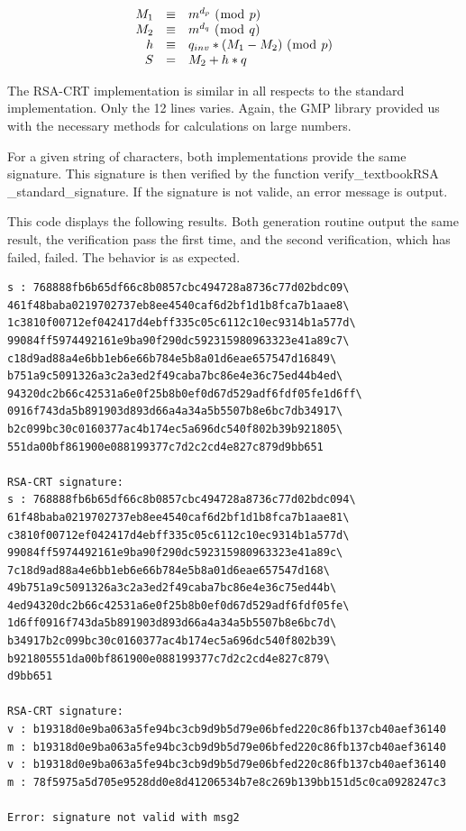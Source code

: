 \documentclass[a4paper]{report}
\begin{document}
\[
\left .
   \begin{array}{r c l}
      M_1      & \equiv & m^{d_p}\ (\bmod\ p) \\
      M_2      & \equiv & m^{d_q}\ (\bmod\ q) \\
      h           & \equiv & q_{inv} * (M_1 - M_2)\ (\bmod\ p) \\
      S          & =         & M_2 + h*q 
   \end{array}
\right .
\]

The RSA-CRT implementation is similar in all respects to the standard implementation. Only the 12 lines varies. Again, the GMP library provided us with the necessary methods for calculations on large numbers.


For a given string of characters, both implementations provide the same signature. This signature is then verified by the function verify\_textbookRSA\\\_standard\_signature. If the signature is not valide, an error message is output.


This code displays the following results. Both generation routine output the same result, the verification pass the first time, and the second verification, which has failed, failed. The behavior is as expected.

\begin{verbatim}
s : 768888fb6b65df66c8b0857cbc494728a8736c77d02bdc09\
461f48baba0219702737eb8ee4540caf6d2bf1d1b8fca7b1aae8\
1c3810f00712ef042417d4ebff335c05c6112c10ec9314b1a577d\
99084ff5974492161e9ba90f290dc592315980963323e41a89c7\
c18d9ad88a4e6bb1eb6e66b784e5b8a01d6eae657547d16849\
b751a9c5091326a3c2a3ed2f49caba7bc86e4e36c75ed44b4ed\
94320dc2b66c42531a6e0f25b8b0ef0d67d529adf6fdf05fe1d6ff\
0916f743da5b891903d893d66a4a34a5b5507b8e6bc7db34917\
b2c099bc30c0160377ac4b174ec5a696dc540f802b39b921805\
551da00bf861900e088199377c7d2c2cd4e827c879d9bb651

RSA-CRT signature:
s : 768888fb6b65df66c8b0857cbc494728a8736c77d02bdc094\
61f48baba0219702737eb8ee4540caf6d2bf1d1b8fca7b1aae81\
c3810f00712ef042417d4ebff335c05c6112c10ec9314b1a577d\
99084ff5974492161e9ba90f290dc592315980963323e41a89c\
7c18d9ad88a4e6bb1eb6e66b784e5b8a01d6eae657547d168\
49b751a9c5091326a3c2a3ed2f49caba7bc86e4e36c75ed44b\
4ed94320dc2b66c42531a6e0f25b8b0ef0d67d529adf6fdf05fe\
1d6ff0916f743da5b891903d893d66a4a34a5b5507b8e6bc7d\
b34917b2c099bc30c0160377ac4b174ec5a696dc540f802b39\
b921805551da00bf861900e088199377c7d2c2cd4e827c879\
d9bb651

RSA-CRT signature:
v : b19318d0e9ba063a5fe94bc3cb9d9b5d79e06bfed220c86fb137cb40aef36140
m : b19318d0e9ba063a5fe94bc3cb9d9b5d79e06bfed220c86fb137cb40aef36140
v : b19318d0e9ba063a5fe94bc3cb9d9b5d79e06bfed220c86fb137cb40aef36140
m : 78f5975a5d705e9528dd0e8d41206534b7e8c269b139bb151d5c0ca0928247c3

Error: signature not valid with msg2
\end{verbatim}
\end{document}
